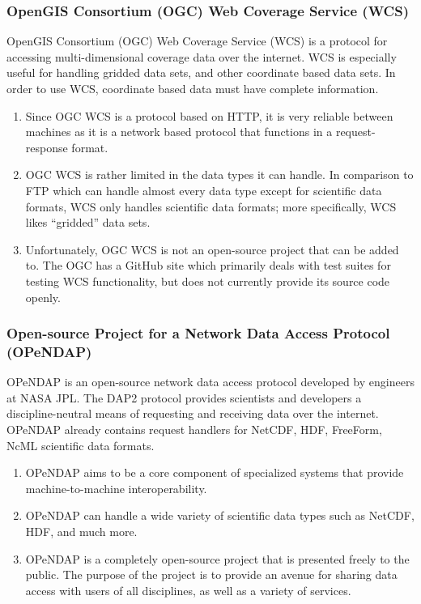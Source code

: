 \documentclass[onecolumn, draftclsnofoot,10pt, compsoc]{IEEEtran}
\begin{document}
\subsubsection{OpenGIS Consortium (OGC) Web Coverage Service (WCS)}
OpenGIS Consortium (OGC) Web Coverage Service (WCS) is a protocol for accessing multi-dimensional coverage data over the internet. WCS is especially useful for handling gridded data sets, and other coordinate based data sets. In order to use WCS, coordinate based data must have complete information.
\begin{enumerate}
\item Since OGC WCS is a protocol based on HTTP, it is very reliable between machines as it is a network based protocol that functions in a request-response format.
\item OGC WCS is rather limited in the data types it can handle. In comparison to FTP which can handle almost every data type except for scientific data formats, WCS only handles scientific data formats; more specifically, WCS likes “gridded” data sets.
\item Unfortunately, OGC WCS is not an open-source project that can be added to. The OGC has a GitHub site which primarily deals with test suites for testing WCS functionality, but does not currently provide its source code openly.
\end{enumerate}

\subsubsection{Open-source Project for a Network Data Access Protocol (OPeNDAP)}
OPeNDAP is an open-source network data access protocol developed by engineers at NASA JPL. The DAP2 protocol provides scientists and developers a discipline-neutral means of requesting and receiving data over the internet. OPeNDAP already contains request handlers for NetCDF, HDF, FreeForm, NcML scientific data formats.
\begin{enumerate}
\item OPeNDAP aims to be a core component of specialized systems that provide machine-to-machine interoperability.
\item OPeNDAP can handle a wide variety of scientific data types such as NetCDF, HDF, and much more.
\item OPeNDAP is a completely open-source project that is presented freely to the public. The purpose of the project is to provide an avenue for sharing data access with users of all disciplines, as well as a variety of services. 
\end{enumerate}
\end{document}
